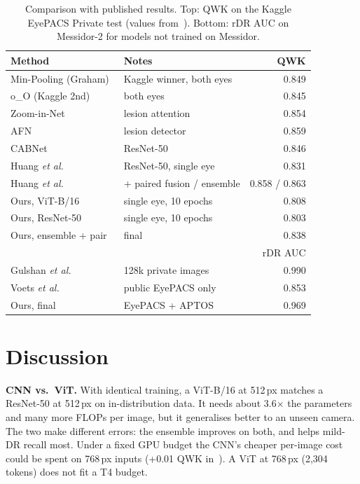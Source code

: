 \documentclass[conference,a4paper]{IEEEtran}
\begin{document}
\begin{table}[t]
\centering\caption{Comparison with published results. Top: QWK on the Kaggle EyePACS Private test (values from~\cite{huang}). Bottom: rDR AUC on Messidor-2 for models not trained on Messidor.}\label{tab:sota}
\footnotesize
\begin{tabular}{@{}llr@{}}
\toprule
Method & Notes & QWK\\
\midrule
Min-Pooling (Graham)~\cite{graham} & Kaggle winner, both eyes & 0.849\\
o\_O (Kaggle 2nd) & both eyes & 0.845\\
Zoom-in-Net~\cite{zoomin} & lesion attention & 0.854\\
AFN~\cite{afn} & lesion detector & 0.859\\
CABNet~\cite{cabnet} & ResNet-50 & 0.846\\
Huang \emph{et al.}~\cite{huang} & ResNet-50, single eye & 0.831\\
Huang \emph{et al.}~\cite{huang} & + paired fusion / ensemble & 0.858 / 0.863\\
\midrule
Ours, ViT-B/16 & single eye, 10 epochs & 0.808\\
Ours, ResNet-50 & single eye, 10 epochs & 0.803\\
Ours, ensemble + pair & final & 0.838\\
\midrule
 & & rDR AUC\\
\midrule
Gulshan \emph{et al.}~\cite{gulshan} & 128k private images & 0.990\\
Voets \emph{et al.}~\cite{voets} & public EyePACS only & 0.853\\
Ours, final & EyePACS + APTOS & 0.969\\
\bottomrule
\end{tabular}
\end{table}

\section{Discussion}
\textbf{CNN vs.\ ViT.} With identical training, a ViT-B/16 at 512\,px matches a ResNet-50 at 512\,px on in-distribution data. It needs about 3.6$\times$ the parameters and many more FLOPs per image, but it generalises better to an unseen camera.
The two make different errors: the ensemble improves on both, and helps mild-DR recall most.
Under a fixed GPU budget the CNN's cheaper per-image cost could be spent on 768\,px inputs (+0.01 QWK in~\cite{huang}). A ViT at 768\,px (2,304 tokens) does not fit a T4 budget.
\end{document}
